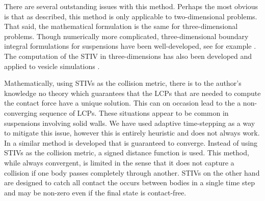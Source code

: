 \documentclass[preprint, 10pt]{elsarticle}
\begin{document}
There are several outstanding issues with this method. Perhaps the most obvious is that as described, this method is only applicable to two-dimensional problems. That said, the mathematical formulation is the same for three-dimensional problems. Though numerically more complicated, three-dimensional boundary integral formulations for suspensions have been well-developed, see for example \cite{Corona2017}. The computation of the STIV in three-dimensions has also been developed \cite{Harmon2011} and applied to vesicle simulations \cite{Zorin2017}.

Mathematically, using STIVs as the collision metric, there is to the
author's knowledge no theory which guarantees that the LCPs that are
needed to compute the contact force have a unique solution. This can on
occasion lead to the a non-converging sequence of LCPs. These situations
appear to be common in suspensions involving solid walls. We have used
adaptive time-stepping as a way to mitigate this issue, however this is
entirely heuristic and does not always work. In \cite{Yan2017} a similar
method is developed that is guaranteed to converge. Instead of using
STIVs as the collision metric, a signed distance function is used. This
method, while always convergent, is limited in the sense that it does
not capture a collision if one body passes completely through another.
STIVs on the other hand are designed to catch all contact the occurs
between bodies in a single time step and may be non-zero even if the final state is contact-free. 



 

\end{document}
